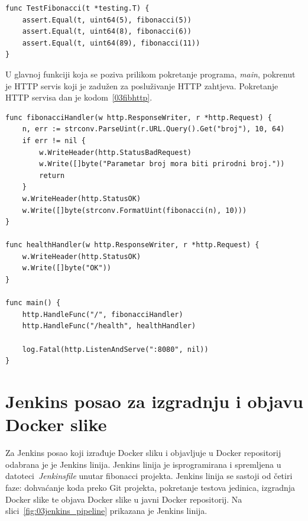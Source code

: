 \begin{lstlisting}
func TestFibonacci(t *testing.T) {
	assert.Equal(t, uint64(5), fibonacci(5))
	assert.Equal(t, uint64(8), fibonacci(6))
	assert.Equal(t, uint64(89), fibonacci(11))
}
\end{lstlisting}

U glavnoj funkciji koja se poziva prilikom pokretanje programa, \textit{main}, pokrenut je HTTP
servis koji je zadužen za posluživanje HTTP zahtjeva. Pokretanje HTTP servisa dan je
kodom~\ref{03fibhttp}.

\begin{lstlisting}
func fibonacciHandler(w http.ResponseWriter, r *http.Request) {
	n, err := strconv.ParseUint(r.URL.Query().Get("broj"), 10, 64)
	if err != nil {
		w.WriteHeader(http.StatusBadRequest)
		w.Write([]byte("Parametar broj mora biti prirodni broj."))
		return
	}
	w.WriteHeader(http.StatusOK)
	w.Write([]byte(strconv.FormatUint(fibonacci(n), 10)))
}

func healthHandler(w http.ResponseWriter, r *http.Request) {
	w.WriteHeader(http.StatusOK)
	w.Write([]byte("OK"))
}

func main() {
	http.HandleFunc("/", fibonacciHandler)
	http.HandleFunc("/health", healthHandler)

	log.Fatal(http.ListenAndServe(":8080", nil))
}
\end{lstlisting}

\section{Jenkins posao za izgradnju i objavu Docker slike}
Za Jenkins posao koji izrađuje Docker sliku i objavljuje u Docker repositorij odabrana je je Jenkins
linija. Jenkins linija je isprogramirana i spremljena u datoteci~\textit{Jenkinsfile} unutar
fibonacci projekta. Jenkins linija se sastoji od četiri faze: dohvaćanje koda preko Git projekta,
pokretanje testova jedinica, izgradnja Docker slike te objava Docker slike u javni Docker
repositorij. Na slici~\ref{fig:03jenkins_pipeline} prikazana je Jenkins linija.

